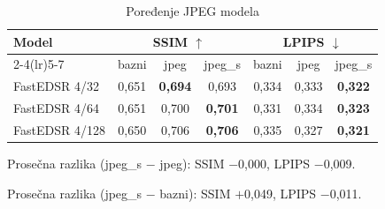 \begin{table}[H]
    \begin{tabular}{lcccccc}
        \toprule
        Model & \multicolumn{3}{c}{SSIM $\uparrow$} & \multicolumn{3}{c}{LPIPS $\downarrow$} \\
        \cmidrule(lr){2-4}\cmidrule(lr){5-7}
         & bazni & jpeg & jpeg\_s & bazni & jpeg & jpeg\_s \\
        \midrule
        FastEDSR 4/32 & 0,651 & \textbf{0,694} & 0,693 & 0,334 & 0,333 & \textbf{0,322} \\
        FastEDSR 4/64 & 0,651 & 0,700 & \textbf{0,701} & 0,331 & 0,334 & \textbf{0,323} \\
        FastEDSR 4/128 & 0,650 & 0,706 & \textbf{0,706} & 0,335 & 0,327 & \textbf{0,321} \\
        \bottomrule
    \end{tabular}
    \caption{Poređenje JPEG modela}
    \label{tab:jpeg_Set14_jpeg_vs_s}
\end{table}

\noindent Prosečna razlika (jpeg\_s $-$ jpeg): SSIM $-$0,000, LPIPS $-$0,009.

\noindent Prosečna razlika (jpeg\_s $-$ bazni): SSIM $+$0,049, LPIPS $-$0,011.